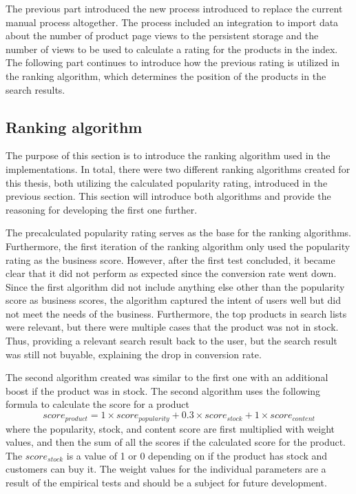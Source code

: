 The previous part introduced the new process introduced to replace the current manual process altogether.
The process included an integration to import data about the number of product page views to the persistent
storage and the number of views to be used to calculate a rating for the products in the index.
The following part continues to introduce how the previous rating is utilized in the ranking algorithm,
which determines the position of the products in the search results.


\subsection{Ranking algorithm}
\label{ss:methodsRanking}

The purpose of this section is to introduce the ranking algorithm used in the implementations.
In total, there were two different ranking algorithms created for this thesis, both utilizing the
calculated popularity rating, introduced in the previous section.
This section will introduce both algorithms and provide the reasoning for developing the first
one further.


The precalculated popularity rating serves as the base for the ranking algorithms.
Furthermore, the first iteration of the ranking algorithm only used the popularity rating 
as the business score.
However, after the first test concluded, it became clear that it did not perform as expected
since the conversion rate went down.
Since the first algorithm did not include anything else other than the popularity score as business scores,
the algorithm captured the intent of users well but did not meet the needs of the business.
Furthermore, the top products in search lists were relevant, but there were multiple cases that the product 
was not in stock.
Thus, providing a relevant search result back to the user, but the search result was still not buyable, 
explaining the drop in conversion rate.


The second algorithm created was similar to the first one with an additional boost if the product was in stock.
The second algorithm uses the following formula to calculate the score for a product
\[ score_{product} = 1 \times score_{popularity} + 0.3 \times score_{stock} + 1 \times score_{content} \]
where the popularity, stock, and content score are first multiplied with weight values, and then 
the sum of all the scores if the calculated score for the product.
The $score_{stock}$ is a value of 1 or 0 depending on if the product has stock and customers can buy it.
The weight values for the individual parameters are a result of the empirical tests and should be a subject
for future development.


